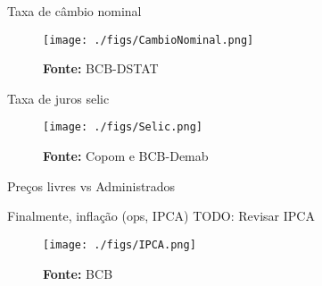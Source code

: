 \documentclass[presentation]{beamer}
\begin{document}
\begin{frame}[label={sec:org9c28bf8}]{Taxa de câmbio nominal}
\begin{figure}[htb]
\centering
\caption{ Índice da taxa de câmbio efetiva nominal\\Jun/1994=100 } 
\texttt{[image: ./figs/CambioNominal.png]}
\label{fig:cambio}
\caption*{\textbf{Fonte:} BCB-DSTAT}
\end{figure}
\end{frame}


\begin{frame}[label={sec:org33c41f7}]{Taxa de juros selic}
\begin{figure}[htb]
\centering
\caption{Taxa de juros selic a.a. (efetivo x meta)\\Anualizada base 252} 
\texttt{[image: ./figs/Selic.png]}
\label{fig:Selic}
\caption*{\textbf{Fonte:} Copom e BCB-Demab}
\end{figure}
\end{frame}


\begin{frame}[label={sec:org3ac8ee9}]{Preços livres vs Administrados}
\end{frame}

\begin{frame}[label={sec:org91eb2b1}]{Finalmente, inflação (ops, IPCA)}
\alert{TODO:} Revisar IPCA

\begin{figure}[htb]
\centering
\caption{IPCA e Metas para Inflação} 
\texttt{[image: ./figs/IPCA.png]}
\label{fig:IPCA}
\caption*{\textbf{Fonte:} BCB}
\end{figure}
\end{frame}
\end{document}
